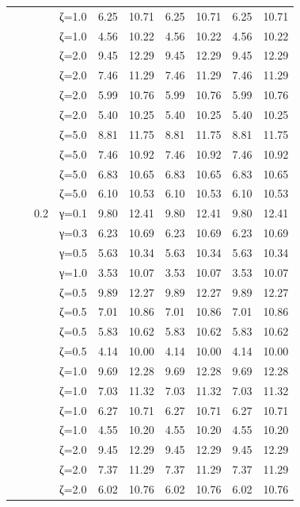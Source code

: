 \begin{table}[htbp]
\begin{tabular}{ll r l  rr  rr  rr}
  &  &  & ζ=1.0 & 6.25 & 10.71 & 6.25 & 10.71 & 6.25 & 10.71 \\
  &  &  & ζ=1.0 & 4.56 & 10.22 & 4.56 & 10.22 & 4.56 & 10.22 \\
  &  &  & ζ=2.0 & 9.45 & 12.29 & 9.45 & 12.29 & 9.45 & 12.29 \\
  &  &  & ζ=2.0 & 7.46 & 11.29 & 7.46 & 11.29 & 7.46 & 11.29 \\
  &  &  & ζ=2.0 & 5.99 & 10.76 & 5.99 & 10.76 & 5.99 & 10.76 \\
  &  &  & ζ=2.0 & 5.40 & 10.25 & 5.40 & 10.25 & 5.40 & 10.25 \\
  &  &  & ζ=5.0 & 8.81 & 11.75 & 8.81 & 11.75 & 8.81 & 11.75 \\
  &  &  & ζ=5.0 & 7.46 & 10.92 & 7.46 & 10.92 & 7.46 & 10.92 \\
  &  &  & ζ=5.0 & 6.83 & 10.65 & 6.83 & 10.65 & 6.83 & 10.65 \\
  &  &  & ζ=5.0 & 6.10 & 10.53 & 6.10 & 10.53 & 6.10 & 10.53 \\
  &  & 0.2 & γ=0.1 & 9.80 & 12.41 & 9.80 & 12.41 & 9.80 & 12.41 \\
  &  &  & γ=0.3 & 6.23 & 10.69 & 6.23 & 10.69 & 6.23 & 10.69 \\
  &  &  & γ=0.5 & 5.63 & 10.34 & 5.63 & 10.34 & 5.63 & 10.34 \\
  &  &  & γ=1.0 & 3.53 & 10.07 & 3.53 & 10.07 & 3.53 & 10.07 \\
  &  &  & ζ=0.5 & 9.89 & 12.27 & 9.89 & 12.27 & 9.89 & 12.27 \\
  &  &  & ζ=0.5 & 7.01 & 10.86 & 7.01 & 10.86 & 7.01 & 10.86 \\
  &  &  & ζ=0.5 & 5.83 & 10.62 & 5.83 & 10.62 & 5.83 & 10.62 \\
  &  &  & ζ=0.5 & 4.14 & 10.00 & 4.14 & 10.00 & 4.14 & 10.00 \\
  &  &  & ζ=1.0 & 9.69 & 12.28 & 9.69 & 12.28 & 9.69 & 12.28 \\
  &  &  & ζ=1.0 & 7.03 & 11.32 & 7.03 & 11.32 & 7.03 & 11.32 \\
  &  &  & ζ=1.0 & 6.27 & 10.71 & 6.27 & 10.71 & 6.27 & 10.71 \\
  &  &  & ζ=1.0 & 4.55 & 10.20 & 4.55 & 10.20 & 4.55 & 10.20 \\
  &  &  & ζ=2.0 & 9.45 & 12.29 & 9.45 & 12.29 & 9.45 & 12.29 \\
  &  &  & ζ=2.0 & 7.37 & 11.29 & 7.37 & 11.29 & 7.37 & 11.29 \\
  &  &  & ζ=2.0 & 6.02 & 10.76 & 6.02 & 10.76 & 6.02 & 10.76 \\

\end{tabular}
\end{table}
